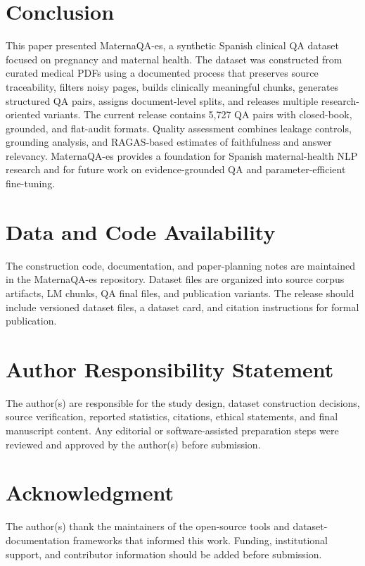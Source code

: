 \documentclass[conference]{IEEEtran}
\begin{document}
\section{Conclusion}
This paper presented MaternaQA-es, a synthetic Spanish clinical QA dataset focused on pregnancy and maternal health. The dataset was constructed from curated medical PDFs using a documented process that preserves source traceability, filters noisy pages, builds clinically meaningful chunks, generates structured QA pairs, assigns document-level splits, and releases multiple research-oriented variants. The current release contains 5,727 QA pairs with closed-book, grounded, and flat-audit formats. Quality assessment combines leakage controls, grounding analysis, and RAGAS-based estimates of faithfulness and answer relevancy. MaternaQA-es provides a foundation for Spanish maternal-health NLP research and for future work on evidence-grounded QA and parameter-efficient fine-tuning.

\section*{Data and Code Availability}
The construction code, documentation, and paper-planning notes are maintained in the MaternaQA-es repository. Dataset files are organized into source corpus artifacts, LM chunks, QA final files, and publication variants. The release should include versioned dataset files, a dataset card, and citation instructions for formal publication.

\section*{Author Responsibility Statement}
The author(s) are responsible for the study design, dataset construction decisions, source verification, reported statistics, citations, ethical statements, and final manuscript content. Any editorial or software-assisted preparation steps were reviewed and approved by the author(s) before submission.

\section*{Acknowledgment}
The author(s) thank the maintainers of the open-source tools and dataset-documentation frameworks that informed this work. Funding, institutional support, and contributor information should be added before submission.



\end{document}
